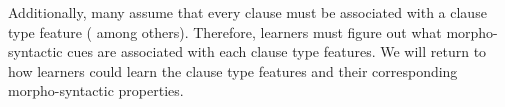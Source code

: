 Additionally, many assume that every clause must be associated with a clause type feature (\cite{chomskylasnik1977, cheng1991} among others). Therefore, learners must figure out what morpho-syntactic cues are associated with each clause type features. We will return to how learners could learn the clause type features and their corresponding morpho-syntactic properties. %
\begin{comment}
This knowledge, that the presence of subject-auxiliary inversion indicates a [+int] and not [-int] value of $C^{0}$, has to be learned from the input and likewise for other surface formal properties relevant for clause typing. This is because the relevant properties indicative of the value of $C^{0}$ (and the clause type category of the sentence) differ from language to language. For example, as we will discuss in detail in the next chapter, Mandarin-acquiring infants, unlike English-acquiring infants, need to pick out that [+int] is expressed by the presence of a sentence-final particle, specifically the particle \tit{ma}, and hence should use this surface feature to cluster sentences into clause types.



Many theories assume that clauses must be ``typed,'' namely identified with their clause type category, to trigger certain operations. For example, \textcite{chomskylasnik1977} assumes that COMP must be identified with [$\pm$ wh] for verb selection purposes. Their intuition is that each clause must be identified as a declarative ($-$wh) or an interrogative (+wh). \textcite{cheng1991} formulates this intuition with the Clause Typing Hypothesis:

\begin{quote}
Every clause needs to be typed. In the case of typing a \twh-question, either a \twh-particle in $C^{0}$ is used or else fronting of a \twh-word to the Spec of $C^{0}$ is used, thereby typing a clause through $C^{0}$ by Spec-head agreement. \hfill \textcite[p.9]{cheng1991}

\end{quote}

While the specific way that a clause can be typed has been debated in the literature, people generally agree that identifying the [$\pm$ int] feature on $C_{0}$ is necessary. This means that, learners of grammar must be able to type a clause. %
\end{comment}

